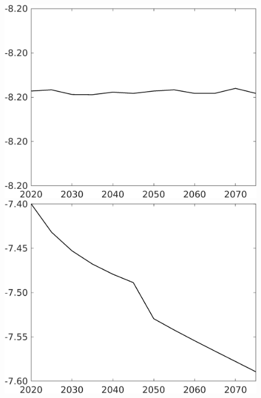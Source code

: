 \documentclass[12pt]{article}
\begin{document}
\begin{figure}[h!!]
\begin{minipage}[]{0.32\textwidth}
	\end{minipage}	
	\begin{minipage}[]{0.32\textwidth}
		\includegraphics[width=1\textwidth]{../../codding_model/own_basedOnFried/optimalPol_010922_revision/figures/all_13Sept22/CompTaufPER_bytaul_Reg0_hl_spillover0_nsk1_xgr0_knspil0_sep1_LFlimit1_emsbase0_countec0_GovRev0_etaa0.79_lgd0.png}
	\end{minipage}	
	\begin{minipage}[]{0.32\textwidth}
		\includegraphics[width=1\textwidth]{../../codding_model/own_basedOnFried/optimalPol_010922_revision/figures/all_13Sept22/CompTaufPER_bytaul_Reg0_C_spillover0_nsk1_xgr0_knspil0_sep1_LFlimit1_emsbase0_countec0_GovRev0_etaa0.79_lgd0.png}

\end{minipage}
\end{figure}
\end{document}
